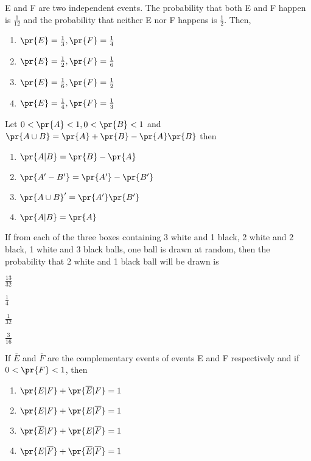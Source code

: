 \item E and F are two independent events. The probability that both E and F happen is $\frac{1}{12}$ and the probability that neither E nor F happens is $\frac{1}{2}$. Then,
\hfill{}
\begin{enumerate}
\item $\pr{E}=\frac{1}{3},\pr{F}=\frac{1}{4}$
\item $\pr{E}=\frac{1}{2},\pr{F}=\frac{1}{6}$
\item $\pr{E}=\frac{1}{6},\pr{F}=\frac{1}{2}$
\item $\pr{E}=\frac{1}{4},\pr{F}=\frac{1}{3}$
\end{enumerate}
\item Let $0<\pr{A}<1,0<\pr{B}<1$ and $\pr{A\cup B}=\pr{A}+\pr{B}-\pr{A}\pr{B}$ then
\hfill{}
\begin{enumerate}
\item $\pr{A|B}=\pr{B}-\pr{A}$
\item $\pr{A'-B'}=\pr{A'}-\pr{B'}$
\item $\pr{A\cup B}'=\pr{A'}\pr{B'}$
\item $\pr{A|B}=\pr{A}$
\end{enumerate}
\item If from each of the three boxes containing 3 white and 1 black, 2 white and 2 black, 1 white and 3 black balls, one ball is drawn at random, then the probability that 2 white and 1 black ball will be drawn is
\hfill{}
\begin{enumerate}
\begin{multicols}{4}
\item $\frac{13}{32}$
\columnbreak
\item $\frac{1}{4}$
\columnbreak
\item $\frac{1}{32}$
\columnbreak
\item $\frac{3}{16}$
\end{multicols} 
\end{enumerate}
\item If $\overline{E}$ and $\overline{F}$ are the complementary events of events E and F respectively and if $0<\pr{F}<1$, then
\hfill{}
\begin{enumerate}
\item $\pr{E|F}+\pr{\overline{E}|F}=1$
\item $\pr{E|F}+\pr{E|\overline{F}}=1$
\item $\pr{\overline{E}|F}+\pr{E|\overline{F}}=1$
\item $\pr{E|\overline{F}}+\pr{\overline{E}|\overline{F}}=1$
\end{enumerate}
